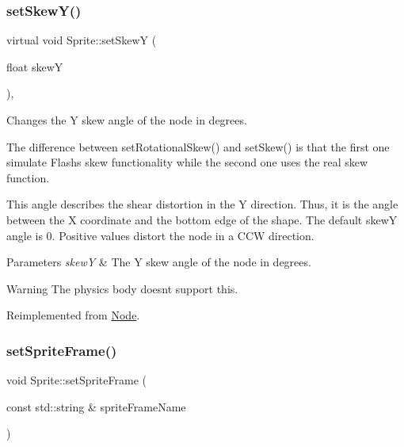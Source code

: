 \mbox{\label{classSprite_a5472345454102a7682c929b974573879}} 
\subsubsection{\texorpdfstring{set\+Skew\+Y()}{setSkewY()}\hspace{0.1cm}{\footnotesize\ttfamily [2/2]}}
{\footnotesize\ttfamily virtual void Sprite\+::set\+SkewY (\begin{DoxyParamCaption}\item[{float}]{skewY }\end{DoxyParamCaption})\hspace{0.3cm}{\ttfamily [override]}, {\ttfamily [virtual]}}

Changes the Y skew angle of the node in degrees.

The difference between {\ttfamily set\+Rotational\+Skew()} and {\ttfamily set\+Skew()} is that the first one simulate Flash\textquotesingle{}s skew functionality while the second one uses the real skew function.

This angle describes the shear distortion in the Y direction. Thus, it is the angle between the X coordinate and the bottom edge of the shape. The default skewY angle is 0. Positive values distort the node in a C\+CW direction.


\begin{DoxyParams}{Parameters}
{\em skewY} & The Y skew angle of the node in degrees.\\
\hline
\end{DoxyParams}
\begin{DoxyWarning}{Warning}
The physics body doesn\textquotesingle{}t support this. 
\end{DoxyWarning}


Reimplemented from \hyperlink{classNode_ac1f4c4be8099a0d4bca1464c51f81f94}{Node}.

\mbox{\label{classSprite_a858e1904c720bdea7cb6a6ad512f1195}} 
\subsubsection{\texorpdfstring{set\+Sprite\+Frame()}{setSpriteFrame()}\hspace{0.1cm}{\footnotesize\ttfamily [1/2]}}
{\footnotesize\ttfamily void Sprite\+::set\+Sprite\+Frame (\begin{DoxyParamCaption}\item[{const std\+::string \&}]{sprite\+Frame\+Name }\end{DoxyParamCaption})\hspace{0.3cm}{\ttfamily [virtual]}}

